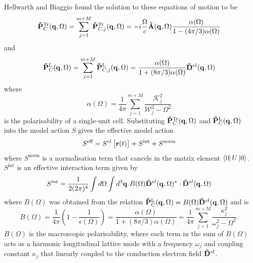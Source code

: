 Hellwarth and Biaggio found the solution to these equations of motion to be
\begin{equation} \label{eqn:tr_sol}
    \vb{\Tilde{P}}^{\text{Tr}}_{C}(\vb{q}, \Omega) = \sum_{j = 1}^{m+M} \vb{\Tilde{P}}^{\text{Tr}}_{C, j}(\vb{q}, \Omega) = -i \frac{\Omega}{c} \vb{\Tilde{A}}(\vb{q}, \Omega) \frac{\alpha(\Omega)}{1 - (4\pi / 3) \alpha(\Omega)}
\end{equation}
and
\begin{equation}
    \vb{\Tilde{P}}^{\text{L}}_{C}(\vb{q}, \Omega) = \sum_{j = 1}^{m+M} \vb{\Tilde{P}}^{\text{L}}_{C, j}(\vb{q}, \Omega) = \frac{\alpha(\Omega)}{1 + (8\pi / 3) \alpha(\Omega)} \vb{\Tilde{D}}^{el}(\vb{q}, \Omega)
\end{equation}
where
\begin{equation}
    \alpha(\Omega) = \frac{1}{4\pi} \sum_{j=1}^{m+M} \frac{\mathcal{K}_j^2}{\mathcal{W}_j^2 - \Omega^2}
\end{equation}
is the polarisability of a single-unit cell. Substituting $\vb{\Tilde{P}}^{\text{Tr}}_{C}(\vb{q}, \Omega)$ and $\vb{\Tilde{P}}^{\text{L}}_{C}(\vb{q}, \Omega)$ into the model action $S$ gives the effective model action 
\begin{equation}
    S^{\text{eff}} = S^{el}\left[ \vb{r}(t) \right] + S^{\text{int}} + S^{\text{norm}}
\end{equation}
where $S^{\text{norm}}$ is a normalisation term that cancels in the matrix element $\bra{0} U \ket{0}$. $S^{\text{int}}$ is an effective interaction term given by
\begin{equation}
    S^{\text{int}} = \frac{1}{2 (2\pi)^4} \int d\Omega \int d^3 \vb{q}\ B(\Omega) \vb{\Tilde{D}}^{el}(\vb{q}, \Omega)^* \cdot \vb{\Tilde{D}}^{el}(\vb{q}, \Omega)
\end{equation}
where $B(\Omega)$ was obtained from the relation $\vb{\Tilde{P}}^{\text{L}}_{C}(\vb{q}, \Omega) = B(\Omega) \vb{\Tilde{D}}^{el}(\vb{q}, \Omega)$ and is
\begin{equation}
    B(\Omega) = \frac{1}{4\pi} \left( 1 - \frac{1}{\epsilon(\Omega)} \right) = \frac{\alpha(\Omega)}{1+(8\pi/3)\alpha(\Omega)} = \frac{1}{4\pi} \sum_{j = 1}^{m + M} \frac{\kappa_j^2}{\omega_j^2 - \Omega^2}.
\end{equation}
$B(\Omega)$ is the macroscopic polarisability, where each term in the sum of $B(\Omega)$ acts as a harmonic longitudinal lattice mode with a frequency $\omega_j$ and coupling constant $\kappa_j$ that linearly coupled to the conduction electron field $\vb{\Tilde{D}}^{el}$. 

